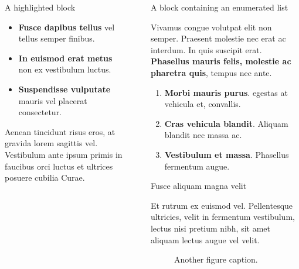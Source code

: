 \documentclass[final]{beamer}
\newlength{\sepwidth}
\newlength{\colwidth}
\newcommand{\separatorcolumn}{\begin{column}{\sepwidth}\end{column}}
\begin{document}
\begin{frame}[t]
\begin{columns}[t]
\begin{column}{\colwidth}
\begin{coralblock}{A highlighted block}
    \begin{itemize}
      \item \textbf{Fusce dapibus tellus} vel tellus semper finibus.
      \item \textbf{In euismod erat metus} non ex vestibulum luctus.
      \item \textbf{Suspendisse vulputate} mauris vel placerat consectetur.
    \end{itemize}

    Aenean tincidunt risus eros, at gravida lorem sagittis vel. Vestibulum ante
    ipsum primis in faucibus orci luctus et ultrices posuere cubilia Curae.

  \end{coralblock}

\end{column}

\separatorcolumn

\begin{column}{\colwidth}

  \begin{block}{A block containing an enumerated list}

    Vivamus congue volutpat elit non semper. Praesent molestie nec erat ac
    interdum. In quis suscipit erat. \textbf{Phasellus mauris felis, molestie
    ac pharetra quis}, tempus nec ante.

    \begin{enumerate}
      \item \textbf{Morbi mauris purus}. egestas at vehicula et, convallis.
      \item \textbf{Cras vehicula blandit}. Aliquam blandit nec massa ac.
      \item \textbf{Vestibulum et massa}. Phasellus fermentum augue.
    \end{enumerate}

  \end{block}

  \begin{block}{Fusce aliquam magna velit}

    Et rutrum ex euismod vel. Pellentesque ultricies, velit in fermentum
    vestibulum, lectus nisi pretium nibh, sit amet aliquam lectus augue vel
    velit.

    \begin{figure}
      \centering
      \caption{Another figure caption.}
    \end{figure}


\end{block}
\end{column}
\end{columns}
\end{frame}
\end{document}
